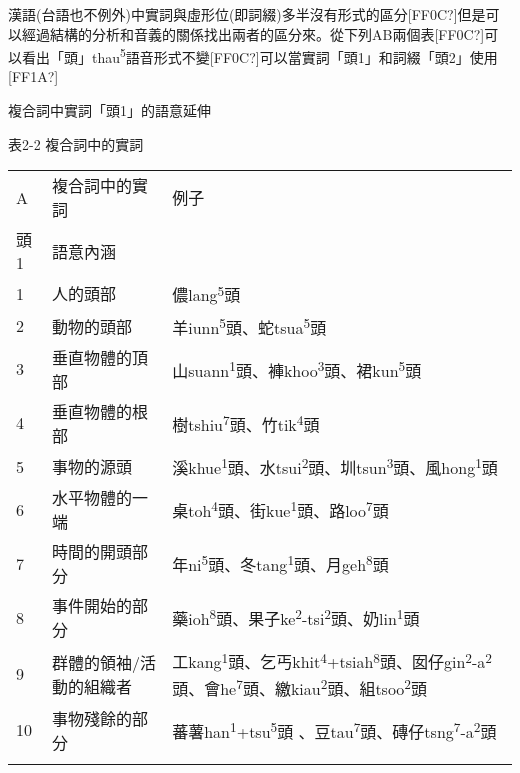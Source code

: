 \textrm{漢語(台語也不例外)中實詞與虛形位(即詞綴)多半沒有形式的區分[FF0C?]但是可以經過結構的分析和音義的關係找出兩者的區分來。從下列AB兩個表[FF0C?]可以看出「頭」thau}\textrm{\textsuperscript{5}}\textrm{語音形式不變[FF0C?]可以當實詞「頭1」和詞綴「頭2」使用[FF1A?]}

\textrm{複合詞中實詞「頭1」的語意延伸}

表2-2 複合詞中的實詞

\tablefirsthead{}

\tabletail{}
\tablelasttail{}
\begin{tabularx}{\textwidth}{XXX}
\lsptoprule

A & 複合詞中的實詞 & 例子\\
\hhline{--~}
頭1 & \multicolumn{1}{X}{ 語意內涵} & \\
1 & 人的頭部 & {\sffamily \textrm{儂lang}\textrm{\textsuperscript{5}}\textrm{頭}}\\
2 & 動物的頭部 & {\sffamily \textrm{羊iunn}\textrm{\textsuperscript{5}}\textrm{頭、蛇tsua}\textrm{\textsuperscript{5}}\textrm{頭}}\\
3 & 垂直物體的頂部 & {\sffamily \textrm{山suann}\textrm{\textsuperscript{1}}\textrm{頭、褲khoo}\textrm{\textsuperscript{3}}\textrm{頭、裙kun}\textrm{\textsuperscript{5}}\textrm{頭}}\\
4 & 垂直物體的根部 & {\sffamily \textrm{樹tshiu}\textrm{\textsuperscript{7}}\textrm{頭、竹tik}\textrm{\textsuperscript{4}}\textrm{頭}}\\
5 & 事物的源頭 & {\sffamily \textrm{溪khue}\textrm{\textsuperscript{1}}\textrm{頭、水tsui}\textrm{\textsuperscript{2}}\textrm{頭、圳tsun}\textrm{\textsuperscript{3}}\textrm{頭、風hong}\textrm{\textsuperscript{1}}\textrm{頭}}\\
6 & 水平物體的一端 & {\sffamily \textrm{桌toh}\textrm{\textsuperscript{4}}\textrm{頭、街kue}\textrm{\textsuperscript{1}}\textrm{頭、路loo}\textrm{\textsuperscript{7}}\textrm{頭}}\\
7 & 時間的開頭部分 & {\sffamily \textrm{年ni}\textrm{\textsuperscript{5}}\textrm{頭、冬tang}\textrm{\textsuperscript{1}}\textrm{頭、月geh}\textrm{\textsuperscript{8}}\textrm{頭}}\\
8 & 事件開始的部分 & {\sffamily \textrm{藥ioh}\textrm{\textsuperscript{8}}\textrm{頭、果子ke}\textrm{\textsuperscript{2}}\textrm{{}-tsi}\textrm{\textsuperscript{2}}\textrm{頭、奶lin}\textrm{\textsuperscript{1}}\textrm{頭}}\\
9 & 群體的領袖/活動的組織者 & {\sffamily \textrm{工kang}\textrm{\textsuperscript{1}}\textrm{頭、乞丐khit}\textrm{\textsuperscript{4}}\textrm{+tsiah}\textrm{\textsuperscript{8}}\textrm{頭、囡仔gin}\textrm{\textsuperscript{2}}\textrm{{}-a}\textrm{\textsuperscript{2}}\textrm{頭、會he}\textrm{\textsuperscript{7}}\textrm{頭、繳kiau}\textrm{\textsuperscript{2}}\textrm{頭、組tsoo}\textrm{\textsuperscript{2}}\textrm{頭}}\\
10 & 事物殘餘的部分 & {\sffamily \textrm{蕃薯han}\textrm{\textsuperscript{1}}\textrm{+tsu}\textrm{\textsuperscript{5}}\textrm{頭 、豆tau}\textrm{\textsuperscript{7}}\textrm{頭、磚仔tsng}\textrm{\textsuperscript{7}}\textrm{{}-a}\textrm{\textsuperscript{2}}\textrm{頭}}\\
\lspbottomrule
\end{tabularx}
